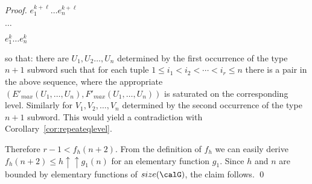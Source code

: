 \documentclass[12pt]{article}
\begin{document}
\begin{proof}
{{$e^{k+\ell}_1 \dots e^{k+\ell}_n$

$\dots$

$e^k_1 \dots e^k_n$
}
}
so that:
there are $U_1,U_2\dots,U_n$ determined by the first occurrence of
the type $n{+}1$ subword
such that
for each tuple $1\leq i_1<i_2<\cdots < i_r\leq n$ there 
is a pair 
in the above sequence, where the appropriate 
$(E'_{max}(U_1,\dots,U_n),F'_{max}(U_1,\dots,U_n))$
is saturated on the corresponding level. Similarly for
$V_1,V_2,\dots,V_n$ 
determined by the second occurrence of the type $n{+}1$ subword.
This 
would yield a contradiction
with Corollary~\ref{cor:repeateqlevel}.

Therefore $r-1<f_h(n+2)$. 
From the definition of $f_h$ we can easily derive 
$f_h(n+2)\leq h \uparrow\uparrow g_1(n)$ for an elementary function 
$g_1$.
Since $h$ and $n$ are bounded by elementary
functions of $size(\calG)$,
the claim follows.
\qed
\end{proof}
\end{document}
